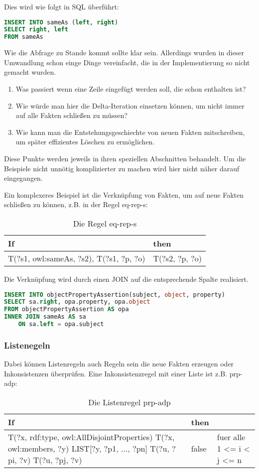 Dies wird wie folgt in SQL überführt:
\begin{lstlisting}[language=SQL]
INSERT INTO sameAs (left, right)
SELECT right, left
FROM sameAs
\end{lstlisting}

Wie die Abfrage zu Stande kommt sollte klar sein. Allerdings wurden in dieser Umwandlung schon einge Dinge vereinfacht, die in der Implementierung so nicht gemacht wurden.

\begin{enumerate}
  \item Was passiert wenn eine Zeile eingefügt werden soll, die schon enthalten ist?
  \item Wie würde man hier die Delta-Iteration einsetzen können, um nicht immer auf alle Fakten schließen zu müssen?
  \item Wie kann man die Entstehungsgeschiechte von neuen Fakten mitschreiben, um später effizientes Löschen zu ermöglichen.
\end{enumerate}

Diese Punkte werden jeweils in ihren speziellen Abschnitten behandelt. Um die Beispiele nicht unnötig komplizierter zu machen wird hier nicht näher darauf eingegangen.

Ein komplexeres Beispiel ist die Verknüpfung von Fakten, um auf neue Fakten schließen zu können, z.B. in der Regel eq-rep-s:
\begin{table}
\begin{tabular}{l|l}
If & then \\ \hline
T(?s1, owl:sameAs, ?s2), T(?s1, ?p, ?o) & T(?s2, ?p, ?o)
\end{tabular}
\caption{Die Regel eq-rep-s}
\label{rule-eq-rep-s}
\end{table}

Die Verknüpfung wird durch einen JOIN auf die entsprechende Spalte realisiert.

\begin{lstlisting}[language=SQL]
INSERT INTO objectPropertyAssertion(subject, object, property)
SELECT sa.right, opa.property, opa.object
FROM objectPropertyAssertion AS opa
INNER JOIN sameAs AS sa
	ON sa.left = opa.subject
\end{lstlisting}

\subsubsection{Listenegeln}
Dabei können Listenregeln auch Regeln sein die neue Fakten erzeugen oder Inkonsistenzen überprüfen. Eine Inkonsistenzregel mit einer Liste ist z.B. prp-adp:
\begin{table}
\begin{tabular}{l|l|l}
If & then & \\ \hline
T(?x, rdf:type, owl:AllDisjointProperties)
T(?x, owl:members, ?y)
LIST[?y, ?p1, ..., ?pn]
T(?u, ?pi, ?v)
T(?u, ?pj, ?v) & false & fuer alle 1 <= i < j <= n
\end{tabular}
\caption{Die Listenregel prp-adp}
\label{rule-prp-adp}
\end{table}


